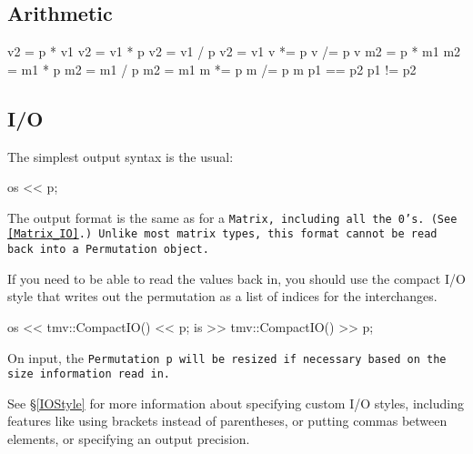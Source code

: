\subsection{Arithmetic}
\label{Permutation_Arithmetic}

\begin{tmvcode}
v2 = p * v1
v2 = v1 * p
v2 = v1 / p
v2 = v1 %
v *= p
v /= p
v %
m2 = p * m1
m2 = m1 * p
m2 = m1 / p
m2 = m1 %
m *= p
m /= p
m %
p1 == p2
p1 != p2
\end{tmvcode}

\vspace{12pt}

\subsection{I/O}
\label{Permutation_IO}

The simplest output syntax is the usual:
\begin{tmvcode}
os << p;
\end{tmvcode}
The output format is the same as for a \tt{Matrix}, including all the 0's.
(See \ref{Matrix_IO}.)  Unlike most matrix types, this format cannot be read back into a
\tt{Permutation} object.  

If you need to be able to read the values back in, you should use the compact I/O style that writes out the permutation as a list of indices for the interchanges.
\begin{tmvcode}
os << tmv::CompactIO() << p;
is >> tmv::CompactIO() >> p;
\end{tmvcode}
On input, the \tt{Permutation p} will be resized if necessary based on the size information read in.

See \S\ref{IOStyle} for more information about specifying custom I/O styles, including
features like using brackets instead of parentheses, or putting commas between elements,
or specifying an output precision.  

